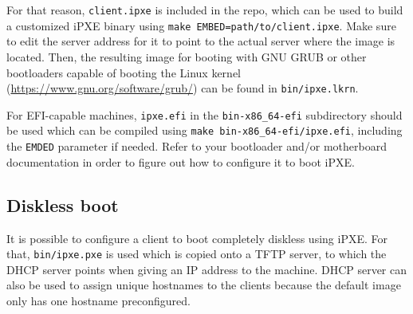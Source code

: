 \documentclass{article}
\begin{document}
For that reason, \verb|client.ipxe| is included in the repo, which can be used to build a customized iPXE binary using \verb|make EMBED=path/to/client.ipxe|. Make sure to edit the server address for it to point to the actual server where the image is located.
Then, the resulting image for booting with GNU GRUB or other bootloaders capable of booting the Linux kernel (\url{https://www.gnu.org/software/grub/}) can be found in \verb|bin/ipxe.lkrn|.

For EFI-capable machines, \verb|ipxe.efi| in the \verb|bin-x86_64-efi| subdirectory should be used which can be compiled using \verb|make bin-x86_64-efi/ipxe.efi|, including the \verb|EMDED| parameter if needed. Refer to your bootloader and/or motherboard documentation in order to figure out how to configure it to boot iPXE.

\subsection{Diskless boot}

It is possible to configure a client to boot completely diskless using iPXE. For that, \verb|bin/ipxe.pxe| is used which is copied onto a TFTP server, to which the DHCP server points when giving an IP address to the machine. DHCP server can also be used to assign unique hostnames to the clients because the default image only has one hostname preconfigured.
\end{document}
